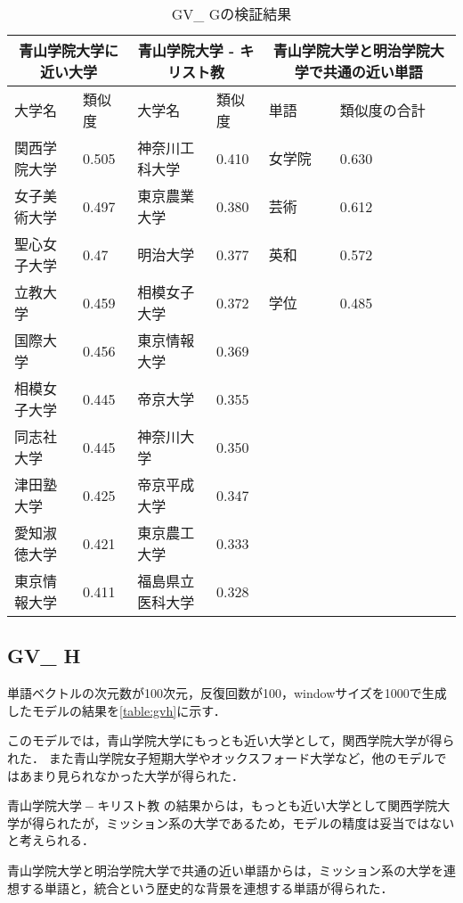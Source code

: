 \begin{table}[H]
\caption{GV\_ Gの検証結果}
\centering
\footnotesize
\begin{tabular}{ll|ll|ll}
\hline
\multicolumn{2}{c}{青山学院大学に近い大学} & \multicolumn{2}{c}{青山学院大学 - キリスト教} & \multicolumn{2}{c}{青山学院大学と明治学院大学で共通の近い単語}
\\ \hline
大学名 & 類似度 & 大学名 & 類似度 & 単語 & 類似度の合計
\\ \hline \hline
関西学院大学 & 0.505 & 神奈川工科大学 & 0.410 & 女学院 & 0.630\\
女子美術大学 & 0.497 & 東京農業大学 & 0.380 & 芸術 & 0.612\\
聖心女子大学 & 0.47 & 明治大学 & 0.377 & 英和 & 0.572\\
立教大学 & 0.459 & 相模女子大学 & 0.372 & 学位 & 0.485\\
国際大学 & 0.456 & 東京情報大学 & 0.369 & & \\
相模女子大学 & 0.445 & 帝京大学 & 0.355 & & \\
同志社大学 & 0.445 & 神奈川大学 & 0.350 & & \\
津田塾大学 & 0.425 & 帝京平成大学 & 0.347 & & \\
愛知淑徳大学 & 0.421 & 東京農工大学 & 0.333 & & \\
東京情報大学 & 0.411 & 福島県立医科大学 & 0.328 & & \\ \hline
\end{tabular}
\label{table:gvg}
\end{table}

\subsection{GV\_ H}
単語ベクトルの次元数が100次元，反復回数が100，windowサイズを1000で生成したモデルの結果を\ref{table:gvh}に示す．

このモデルでは，青山学院大学にもっとも近い大学として，関西学院大学が得られた．
また青山学院女子短期大学やオックスフォード大学など，他のモデルではあまり見られなかった大学が得られた．

$ 青山学院大学 - キリスト教 $ の結果からは，もっとも近い大学として関西学院大学が得られたが，ミッション系の大学であるため，モデルの精度は妥当ではないと考えられる．

青山学院大学と明治学院大学で共通の近い単語からは，ミッション系の大学を連想する単語と，統合という歴史的な背景を連想する単語が得られた．

